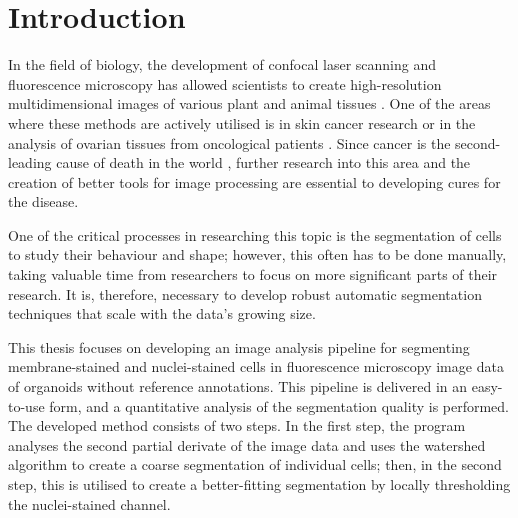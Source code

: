 \documentclass[
  digital,     %
  oneside,     %
  nosansbold,  %
  nocolorbold, %
  lof,         %
  lot,         %
]{fithesis4}
\begin{document}
\chapter*{Introduction}

In the field of biology, the development of confocal laser scanning and
fluorescence microscopy has allowed scientists to create high-resolution multidimensional images of various plant and animal tissues \cite{stegmaier2016}. One of the areas where these methods are actively utilised is in skin cancer research \cite{gupta2020} or in the analysis of ovarian tissues from oncological patients \cite{fabbri2014}. Since cancer is the second-leading cause of death in the world \cite{mayo-clinic-cancer}, further research into this area and the creation of better tools for image processing are essential to developing cures for the disease.

One of the critical processes in researching this topic is the segmentation of cells to study their behaviour and shape; however, this often has to be done manually, taking valuable time from researchers to focus on more significant parts of their research. It is, therefore, necessary to develop robust automatic segmentation techniques that scale with the data's growing size.

This thesis focuses on developing an image analysis pipeline for segmenting membrane-stained and nuclei-stained cells in fluorescence microscopy image data of organoids without reference annotations. This pipeline is delivered in an easy-to-use form, and a quantitative analysis of the segmentation quality is performed. The developed method consists of two steps. In the first step, the program analyses the second partial derivate of the image data and uses the watershed algorithm to create a coarse segmentation of individual cells; then, in the second step, this is utilised to create a better-fitting segmentation by locally thresholding the nuclei-stained channel.
\end{document}
